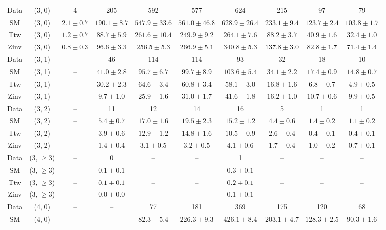 \begin{table}[h!]
{\begin{tabular}{cccccccccc}
	Data & (3, 0) & 4 & 205 & 592 & 577 & 624 & 215 & 97 & 79 \\[0.5ex] 
	SM & (3, 0) & $2.1\pm 0.7$ & $190.1\pm 8.7$ & $547.9\pm 33.6$ & $561.0\pm 46.8$ & $628.9\pm 26.4$ & $233.1\pm 9.4$ & $123.7\pm 2.4$ & $103.8\pm 1.7$ \\[0.5ex] 
	Ttw & (3, 0) & $1.2\pm 0.7$ & $88.7\pm 5.9$ & $261.6\pm 10.4$ & $249.9\pm 9.2$ & $264.1\pm 7.6$ & $88.2\pm 3.7$ & $40.9\pm 1.6$ & $32.4\pm 1.0$ \\[0.5ex] 
	Zinv & (3, 0) & $0.8\pm 0.3$ & $96.6\pm 3.3$ & $256.5\pm 5.3$ & $266.9\pm 5.1$ & $340.8\pm 5.3$ & $137.8\pm 3.0$ & $82.8\pm 1.7$ & $71.4\pm 1.4$ \\[0.5ex] 
	Data & (3, 1) & -- & 46 & 114 & 114 & 93 & 32 & 18 & 10 \\[0.5ex] 
	SM & (3, 1) & -- & $41.0\pm 2.8$ & $95.7\pm 6.7$ & $99.7\pm 8.9$ & $103.6\pm 5.4$ & $34.1\pm 2.2$ & $17.4\pm 0.9$ & $14.8\pm 0.7$ \\[0.5ex] 
	Ttw & (3, 1) & -- & $30.2\pm 2.3$ & $64.6\pm 3.4$ & $60.8\pm 3.4$ & $58.1\pm 3.0$ & $16.8\pm 1.6$ & $6.8\pm 0.7$ & $4.9\pm 0.5$ \\[0.5ex] 
	Zinv & (3, 1) & -- & $9.7\pm 1.0$ & $25.9\pm 1.6$ & $31.0\pm 1.7$ & $41.6\pm 1.8$ & $16.2\pm 1.0$ & $10.7\pm 0.6$ & $9.9\pm 0.5$ \\[0.5ex] 
	Data & (3, 2) & -- & 11 & 12 & 14 & 16 & 5 & 1 & 1 \\[0.5ex] 
	SM & (3, 2) & -- & $5.4\pm 0.7$ & $17.0\pm 1.6$ & $19.5\pm 2.3$ & $15.2\pm 1.2$ & $4.4\pm 0.6$ & $1.4\pm 0.2$ & $1.1\pm 0.2$ \\[0.5ex] 
	Ttw & (3, 2) & -- & $3.9\pm 0.6$ & $12.9\pm 1.2$ & $14.8\pm 1.6$ & $10.5\pm 0.9$ & $2.6\pm 0.4$ & $0.4\pm 0.1$ & $0.4\pm 0.1$ \\[0.5ex] 
	Zinv & (3, 2) & -- & $1.4\pm 0.4$ & $3.1\pm 0.5$ & $3.2\pm 0.5$ & $4.1\pm 0.6$ & $1.7\pm 0.4$ & $1.0\pm 0.2$ & $0.7\pm 0.1$ \\[0.5ex] 
	Data & (3, $\ge3$) & -- & 0 & -- & -- & 1 & -- & -- & -- \\[0.5ex] 
	SM & (3, $\ge3$) & -- & $0.1\pm 0.1$ & -- & -- & $0.3\pm 0.1$ & -- & -- & -- \\[0.5ex] 
	Ttw & (3, $\ge3$) & -- & $0.1\pm 0.1$ & -- & -- & $0.2\pm 0.1$ & -- & -- & -- \\[0.5ex] 
	Zinv & (3, $\ge3$) & -- & $0.0\pm 0.0$ & -- & -- & $0.1\pm 0.1$ & -- & -- & -- \\[0.5ex] 
	Data & (4, 0) & -- & -- & 77 & 181 & 369 & 175 & 120 & 68 \\[0.5ex] 
	SM & (4, 0) & -- & -- & $82.3\pm 5.4$ & $226.3\pm 9.3$ & $426.1\pm 8.4$ & $203.1\pm 4.7$ & $128.3\pm 2.5$ & $90.3\pm 1.6$ \\[0.5ex] 

\end{tabular}}
\end{table}
